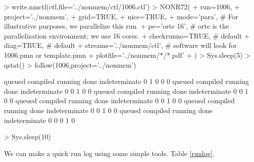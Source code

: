 \begin{Schunk}
\begin{Sinput}
> write.nmctl(ctl,file='../nonmem/ctl/1006.ctl')
> NONR72(
+      run=1006,
+      project='../nonmem',
+      grid=TRUE,
+      nice=TRUE,
+      mode='para',                         # For illustrative purposes, we parallelize this run.
+      pe='orte 16',                        # orte is the parallelization environment; we use 16 cores.
+      checkrunno=TRUE,                     # default
+      diag=TRUE,                           # default
+      streams='../nonmem/ctl',             # software will look for 1006.pmn or template.pmn
+      plotfile='../nonmem/*/*.pdf'
+ )
> Sys.sleep(5)
> qstat()
> follow(1006,project='../nonmem')
\end{Sinput}
\begin{Soutput}
       queued      compiled       running          done indeterminate 
            0             1             0             0             0 
       queued      compiled       running          done indeterminate 
            0             0             1             0             0 
       queued      compiled       running          done indeterminate 
            0             0             1             0             0 
       queued      compiled       running          done indeterminate 
            0             0             1             0             0 
       queued      compiled       running          done indeterminate 
            0             0             1             0             0 
       queued      compiled       running          done indeterminate 
            0             0             0             1             0 
\end{Soutput}
\begin{Sinput}
> Sys.sleep(10)
\end{Sinput}
\end{Schunk}
We can make a quick run log using some simple tools. Table \ref{runlog}.

